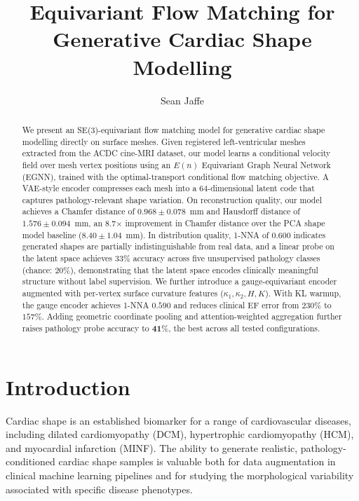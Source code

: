 \documentclass{article}
\title{Equivariant Flow Matching for Generative Cardiac Shape Modelling}
\author{%
  Sean Jaffe \\
}
\begin{document}
\maketitle

\begin{abstract}
We present an SE(3)-equivariant flow matching model for generative cardiac
shape modelling directly on surface meshes.
Given registered left-ventricular meshes extracted from the ACDC cine-MRI
dataset, our model learns a conditional velocity field over mesh vertex
positions using an $E(n)$ Equivariant Graph Neural Network (EGNN), trained
with the optimal-transport conditional flow matching objective.
A VAE-style encoder compresses each mesh into a 64-dimensional latent code
that captures pathology-relevant shape variation.
On reconstruction quality, our model achieves a Chamfer distance of
$0.968 \pm 0.078$~mm and Hausdorff distance of $1.576 \pm 0.094$~mm,
an 8.7$\times$ improvement in Chamfer distance over the PCA shape model
baseline ($8.40 \pm 1.04$~mm).
In distribution quality, 1-NNA of $0.600$ indicates generated shapes are
partially indistinguishable from real data, and a linear probe on the latent
space achieves $33\%$ accuracy across five unsupervised pathology classes
(chance: $20\%$), demonstrating that the latent space encodes
clinically meaningful structure without label supervision.
We further introduce a gauge-equivariant encoder augmented with per-vertex
surface curvature features ($\kappa_1, \kappa_2, H, K$).
With KL warmup, the gauge encoder achieves 1-NNA $0.590$ and reduces
clinical EF error from $230\%$ to $157\%$.
Adding geometric coordinate pooling and attention-weighted aggregation
further raises pathology probe accuracy to $\mathbf{41\%}$, the best
across all tested configurations.
\end{abstract}

\section{Introduction}
\label{sec:intro}

Cardiac shape is an established biomarker for a range of cardiovascular
diseases, including dilated cardiomyopathy (DCM), hypertrophic
cardiomyopathy (HCM), and myocardial infarction (MINF).
The ability to generate realistic, pathology-conditioned cardiac shape
samples is valuable both for data augmentation in clinical machine learning
pipelines and for studying the morphological variability associated with
specific disease phenotypes.
\end{document}
